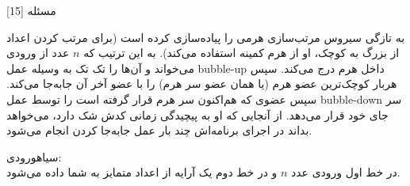 ‌مسئله [15]

% 
%
%
% 
به تازگی سیروس مرتب‌سازی هرمی را پیاده‌سازی کرده است (برای مرتب کردن اعداد از بزرگ به کوچک، او از هرم کمینه استفاده می‌کند). به این ترتیب که $n$ عدد از ورودی می‌خواند و آن‌ها را تک تک به وسیله عمل bubble-up داخل هرم درج می‌کند. سپس هربار کوچک‌ترین عضو هرم (یا همان عضو سر هرم) را با عضو آخر آن جا‌به‌جا می‌کند. سپس عضوی که هم‌اکنون سر هرم قرار گرفته است را توسط عمل bubble-down سر جای خود قرار می‌دهد. از آنجایی که او به پیچیدگی زمانی کدش شک دارد،‌ می‌خواهد بداند در اجرای برنامه‌اش چند بار عمل جابه‌جا کردن انجام می‌شود.

‌سیاه{ورودی:}\\
در خط اول ورودی عدد $n$
و
در خط دوم یک آرایه از اعداد متمایز به شما داده می‌شود.

